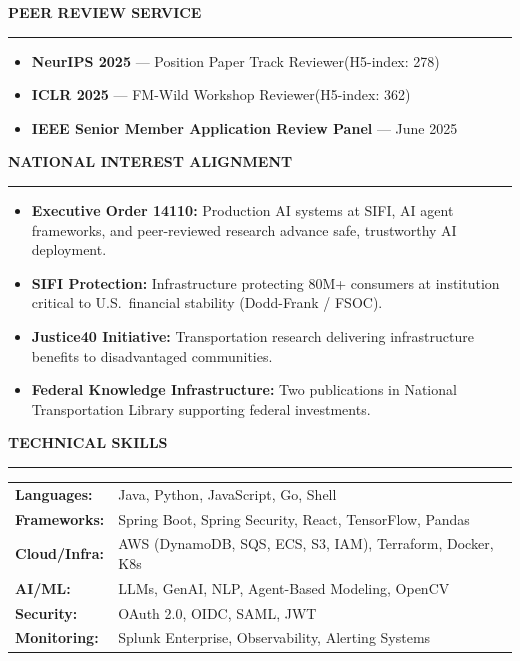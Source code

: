 \documentclass[11pt]{article}
\newcommand{\sect}[1]{%
  \vspace{10pt}%
  {\color{sectioncolor}\large\bfseries\MakeUppercase{#1}}\\[-6pt]%
  {\color{rulecolor}\rule{\textwidth}{1.2pt}}%
  \vspace{4pt}%
}
\begin{document}
\sect{Peer Review Service}

\begin{itemize}
\setlength{\itemsep}{2pt}\setlength{\parsep}{0pt}\setlength{\topsep}{3pt}
    \item \textbf{NeurIPS 2025} --- Position Paper Track Reviewer\quad(H5-index: 278)
    \item \textbf{ICLR 2025} --- FM-Wild Workshop Reviewer\quad(H5-index: 362)
    \item \textbf{IEEE Senior Member Application Review Panel} --- June 2025
\end{itemize}

\sect{National Interest Alignment}

\begin{itemize}
\setlength{\itemsep}{2pt}\setlength{\parsep}{0pt}\setlength{\topsep}{3pt}
    \item \textbf{Executive Order 14110:} Production AI systems at SIFI, AI agent frameworks, and peer-reviewed research advance safe, trustworthy AI deployment.
    \item \textbf{SIFI Protection:} Infrastructure protecting 80M+ consumers at institution critical to U.S.\ financial stability (Dodd-Frank / FSOC).
    \item \textbf{Justice40 Initiative:} Transportation research delivering infrastructure benefits to disadvantaged communities.
    \item \textbf{Federal Knowledge Infrastructure:} Two publications in National Transportation Library supporting federal investments.
\end{itemize}

\sect{Technical Skills}

\begin{tabular}{@{} l l}
\textbf{Languages:}        & Java, Python, JavaScript, Go, Shell \\
\textbf{Frameworks:}       & Spring Boot, Spring Security, React, TensorFlow, Pandas \\
\textbf{Cloud/Infra:}      & AWS (DynamoDB, SQS, ECS, S3, IAM), Terraform, Docker, K8s \\
\textbf{AI/ML:}            & LLMs, GenAI, NLP, Agent-Based Modeling, OpenCV \\
\textbf{Security:}         & OAuth 2.0, OIDC, SAML, JWT \\
\textbf{Monitoring:}       & Splunk Enterprise, Observability, Alerting Systems \\
\end{tabular}
\end{document}
